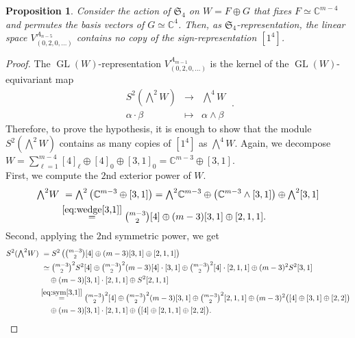 \documentclass[11pt,reqno]{amsart}
\newtheorem{proposition}[theorem]{Proposition}
\theoremstyle{definition}
\numberwithin{theorem}{section}
\DeclareMathOperator{\GL}{GL}
\numberwithin{equation}{section}
\begin{document}
\begin{proposition}\label{prop:sign-rep in sym2wedge2}
Consider the action of $\mathfrak{S}_4$ on $W = F \oplus G$ that fixes $F\simeq \mathbb C^{m-4}$ and permutes the basis vectors of $G\simeq \mathbb C^4$. Then, as $\mathfrak{S}_4$-representation, the linear space $V_{(0,2,0,\ldots)}^{A_{n-5}}$ contains no copy of the sign-representation $[1^4]$.
\end{proposition}
\begin{proof}
The $\GL(W)$-representation $V_{(0,2,0,\ldots)}^{A_{m-1}}$ is the kernel of the $\GL(W)$-equivariant map  
\[ \begin{matrix}
S^2(\textstyle{\bigwedge^2W}) & \rightarrow & \textstyle{\bigwedge^4W} \\
\alpha\cdot \beta & \mapsto & \alpha \wedge \beta
\end{matrix} \ .\] 
Therefore, to prove the hypothesis, it is enough to show that the module $S^2(\bigwedge^2W)$ contains as many copies of $[1^4]$ as $\bigwedge^4W$. Again, we decompose $W=\sum_{\ell=1}^{m-4}[4]_\ell \oplus [4]_0 \oplus [3,1]_0= \mathbb C^{m-3}\oplus [3,1]$. \\
First, we compute the $2$nd exterior power of $W$.
\begin{align*}
{\textstyle \bigwedge^2}W & \  = {\textstyle \bigwedge^2}\left( \mathbb C^{m-3} \oplus [3,1]\right)  = {\textstyle \bigwedge^2}\mathbb C^{m-3} \oplus \left(\mathbb C^{m-3}\wedge [3,1] \right) \oplus {\textstyle \bigwedge^2}[3,1] \\
& \stackrel{\eqref{eq:wedge[3,1]}}{=} {\textstyle \binom{m-3}{2}}[4] \oplus (m-3)[3,1] \oplus [2,1,1] .
\end{align*}
Second, applying the $2$nd symmetric power, we get
\begin{align*}
S^2({\textstyle \bigwedge^2}W) & \ = S^2\left( {\textstyle \binom{m-3}{2}}[4] \oplus (m-3)[3,1] \oplus [2,1,1] \right) \\
& \ \simeq {\textstyle \binom{m-3}{2}^2}S^2[4] \oplus {\textstyle \binom{m-3}{2}^2}(m-3)[4]\cdot [3,1] \oplus {\textstyle \binom{m-3}{2}^2}[4]\cdot [2,1,1] \oplus  (m-3)^2 S^2[3,1] \\
& \ \quad \oplus (m-3)[3,1]\cdot [2,1,1] \oplus S^2[2,1,1] \\
& \stackrel{\eqref{eq:sym[3,1]}}{=} {\textstyle \binom{m-3}{2}^2}[4] \oplus {\textstyle \binom{m-3}{2}^2}(m-3)[3,1] \oplus {\textstyle \binom{m-3}{2}^2}[2,1,1] \oplus (m-3)^2\big( [4] \oplus [3,1] \oplus [2,2] \big) \\
& \ \quad \oplus (m-3)[3,1]\cdot [2,1,1] \oplus \big( [4] \oplus [2,1,1] \oplus [2,2] \big) .

\end{align*}
\end{proof}
\end{document}
